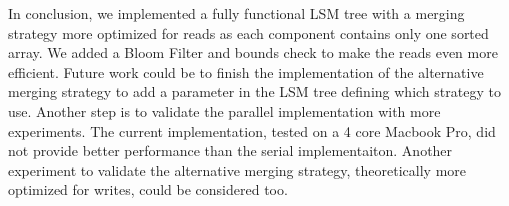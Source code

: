 \documentclass{sig-alternate-05-2015}
\begin{document}
In conclusion, we implemented a fully functional LSM tree with a merging strategy more optimized for reads as each component contains only one sorted array. We added a Bloom Filter and bounds check to make the reads even more efficient. Future work could be to finish the implementation of the alternative merging strategy to add a parameter in the LSM tree defining which strategy to use. Another step is to validate the parallel implementation with more experiments. The current implementation, tested on a 4 core Macbook Pro, did not provide better performance than the serial implementaiton. Another experiment to validate the alternative merging strategy, theoretically more optimized for writes, could be considered too.



\end{document}
